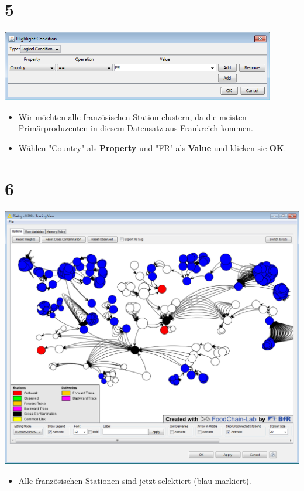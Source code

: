 \documentclass{beamer}
\begin{document}
\section{5}
\begin{frame}
	\begin{center}
  		\includegraphics[width=0.9\textwidth]{5.png}
	\end{center}
	\begin{itemize}
		\item Wir möchten alle französischen Station clustern, da die meisten Primärproduzenten in diesem Datensatz aus Frankreich kommen.
		\item Wählen "Country" als \textbf{Property} und "FR" als \textbf{Value} und klicken sie \textbf{OK}.
	\end{itemize}
\end{frame}

\section{6}
\begin{frame}
	\begin{center}
  		\includegraphics[height=0.6\textheight]{6.png}
	\end{center}
	\begin{itemize}
		\item Alle französischen Stationen sind jetzt selektiert (blau markiert).
	\end{itemize}
\end{frame}
\end{document}
